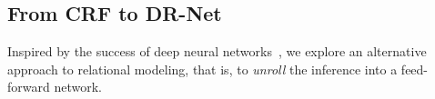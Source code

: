 \documentclass[10pt,twocolumn,letterpaper]{article}
\begin{document}
\subsection{From CRF to DR-Net}%

Inspired by the success of deep neural networks~\cite{he2015deep, Simonyan14c}, 
we explore an alternative approach to relational modeling, 
that is, to \emph{unroll} the inference into a feed-forward network.
\end{document}
